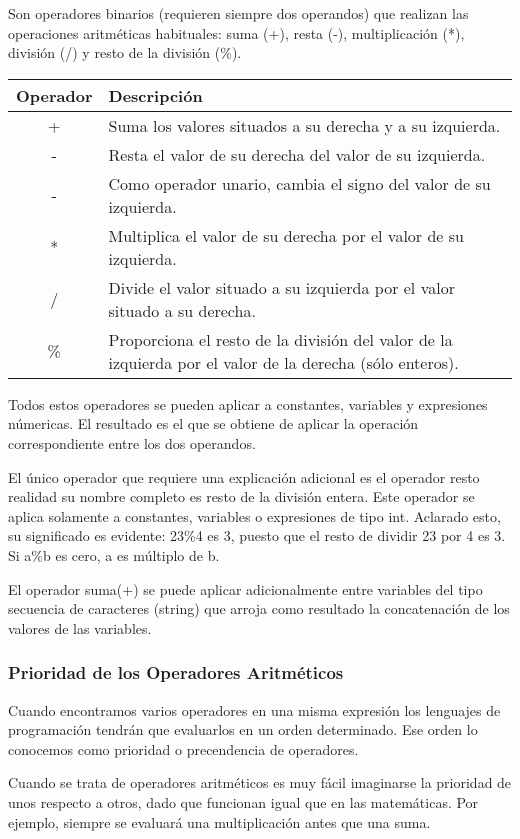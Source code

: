 Son operadores binarios (requieren siempre dos operandos) que realizan las operaciones aritméticas
habituales: suma (+), resta (-), multiplicación (*), división (/) y resto de la división (\%).

\begin{tabular}{|c|p{13.5cm}|}
	\hline
	\textbf{Operador}	&  \textbf{Descripción} \\
	\hline
	+ & Suma los valores situados a su derecha y a su izquierda.  \\
	\hline
	- & Resta el valor de su derecha del valor de su izquierda. \\
	\hline
	- & Como operador unario, cambia el signo del valor de su izquierda.  \\
	\hline
	* & Multiplica el valor de su derecha por el valor de su izquierda. \\
	\hline
	/ & Divide el valor situado a su izquierda por el valor situado a su derecha. \\
	\hline
	\% & Proporciona el resto de la división del valor de la izquierda por el valor de la derecha (sólo
	enteros). \\
	\hline
\end{tabular}

Todos estos operadores se pueden aplicar a constantes, variables y expresiones númericas. El
resultado es el que se obtiene de aplicar la operación correspondiente entre los dos operandos.

El único operador que requiere una explicación adicional es el operador resto %
realidad su nombre completo es resto de la división entera. Este operador se aplica solamente
a constantes, variables o expresiones de tipo int. Aclarado esto, su significado es evidente:
23\%4 es 3, puesto que el resto de dividir 23 por 4 es 3. Si a\%b es cero, a es múltiplo de b.

El operador suma(+) se puede aplicar adicionalmente entre variables del tipo secuencia de caracteres (string) que arroja como resultado la concatenación de los valores de las variables.

\subsubsection{Prioridad de los Operadores Aritméticos}
Cuando encontramos varios operadores en una misma expresión los lenguajes de programación tendrán que evaluarlos en un orden determinado. Ese orden lo conocemos como prioridad o precendencia de operadores.

Cuando se trata de operadores aritméticos es muy fácil imaginarse la prioridad de unos respecto a otros, dado que funcionan igual que en las matemáticas. Por ejemplo, siempre se evaluará una multiplicación antes que una suma.


